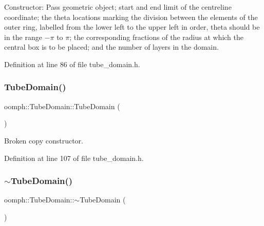 Constructor\+: Pass geometric object; start and end limit of the centreline coordinate; the theta locations marking the division between the elements of the outer ring, labelled from the lower left to the upper left in order, theta should be in the range $-\pi$ to $\pi$; the corresponding fractions of the radius at which the central box is to be placed; and the number of layers in the domain. 



Definition at line 86 of file tube\+\_\+domain.\+h.

\mbox{\label{classoomph_1_1TubeDomain_a39d38474ae91e479d615e315445b22c5}} 
\subsubsection{\texorpdfstring{Tube\+Domain()}{TubeDomain()}\hspace{0.1cm}{\footnotesize\ttfamily [2/2]}}
{\footnotesize\ttfamily oomph\+::\+Tube\+Domain\+::\+Tube\+Domain (\begin{DoxyParamCaption}\item[{const \hyperlink{classoomph_1_1TubeDomain}{Tube\+Domain} \&}]{ }\end{DoxyParamCaption})\hspace{0.3cm}{\ttfamily [inline]}}



Broken copy constructor. 



Definition at line 107 of file tube\+\_\+domain.\+h.

\mbox{\label{classoomph_1_1TubeDomain_ad836e9ab146d2317ed55ee199d54b3e4}} 
\subsubsection{\texorpdfstring{$\sim$\+Tube\+Domain()}{~TubeDomain()}}
{\footnotesize\ttfamily oomph\+::\+Tube\+Domain\+::$\sim$\+Tube\+Domain (\begin{DoxyParamCaption}{ }\end{DoxyParamCaption})\hspace{0.3cm}{\ttfamily [inline]}}



